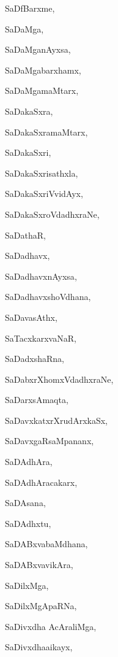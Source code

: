 \begin{multicols}{2}
{SaDfBarxme}, \pageref{SaDfBarxme}

{SaDaMga}, \pageref{SaDaMga}

{SaDaMganAyxsa}, \pageref{SaDaMganAyxsa}

{SaDaMgabarxhamx}, \pageref{SaDaMgabarxhamx}

{SaDaMgamaMtarx}, \pageref{SaDaMgamaMtarx}

{SaDakaSxra}, \pageref{SaDakaSxra}

{SaDakaSxramaMtarx}, \pageref{SaDakaSxramaMtarx}

{SaDakaSxri}, \pageref{SaDakaSxri}

{SaDakaSxrisathxla}, \pageref{SaDakaSxrisathxla}

{SaDakaSxriVvidAyx}, \pageref{SaDakaSxriVvidAyx}

{SaDakaSxroVdadhxraNe}, \pageref{SaDakaSxroVdadhxraNe}

{SaDathaR}, \pageref{SaDathaR}

{SaDadhavx}, \pageref{SaDadhavx}

{SaDadhavxnAyxsa}, \pageref{SaDadhavxnAyxsa}

{SaDadhavxshoVdhana}, \pageref{SaDadhavxshoVdhana}

{SaDavasAthx}, \pageref{SaDavasAthx}

{SaTacxkarxvaNaR}, \pageref{SaTacxkarxvaNaR}

{SaDadxshaRna}, \pageref{SaDadxshaRna}

{SaDabxrXhomxVdadhxraNe}, \pageref{SaDabxrXhomxVdadhxraNe}

{SaDarxsAmaqta}, \pageref{SaDarxsAmaqta}

{SaDavxkatxrXrudArxkaSx}, \pageref{SaDavxkatxrXrudArxkaSx}

{SaDavxgaRsaMpananx}, \pageref{SaDavxgaRsaMpananx}

{SaDAdhAra}, \pageref{SaDAdhAra}

{SaDAdhAracakarx}, \pageref{SaDAdhAracakarx}

{SaDAsana}, \pageref{SaDAsana}

{SaDAdhxtu}, \pageref{SaDAdhxtu}

{SaDABxvabaMdhana}, \pageref{SaDABxvabaMdhana}

{SaDABxvavikAra}, \pageref{SaDABxvavikAra}

{SaDilxMga}, \pageref{SaDilxMga}

{SaDilxMgApaRNa}, \pageref{SaDilxMgApaRNa}

{SaDivxdha AcAraliMga}, \pageref{SaDivxdhaAcAraliMga}

{SaDivxdha{ai}kayx}, 


\end{multicols}
